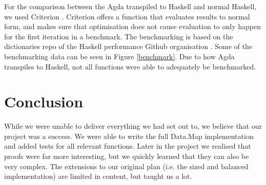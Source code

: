\documentclass[a4paper,UKenglish,cleveref, autoref, thm-restate]{template/lipics-v2021}
\begin{document}
For the comparison between the Agda transpiled to Haskell and normal Haskell, we used Criterion \cite{criterion}. Criterion offers a function that evaluates results to normal form, and makes sure that optimisation does not cause evaluation to only happen for the first iteration in a benchmark. The benchmarking is based on the dictionaries repo of the Haskell performance Github organisation \cite{haskellperf}.\newline
Some of the benchmarking data can be seen in Figure \ref{benchmark}.\newline
Due to how Agda transpiles to Haskell, not all functions were able to adequately be benchmarked.





\section{Conclusion}
While we were unable to deliver everything we had set out to, we believe that our project was a success. We were able to write the full Data.Map implementation and added tests for all relevant functions. Later in the project we realised that proofs were far more interesting, but we quickly learned that they can also be very complex. The extensions to our original plan (i.e. the sized and balanced implementation) are limited in content, but taught us a lot.



\end{document}
